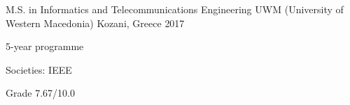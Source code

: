 


\begin{cventries}


\cventry
{M.S. in Informatics and Telecommunications Engineering} %
{UWM (University of Western Macedonia)} %
{Kozani, Greece} %
{2017} %
{ %
\begin{cvitems}
\item {5-year programme}
\item{Societies: IEEE}
\item {Grade 7.67/10.0}
\end{cvitems}
}


\end{cventries}
